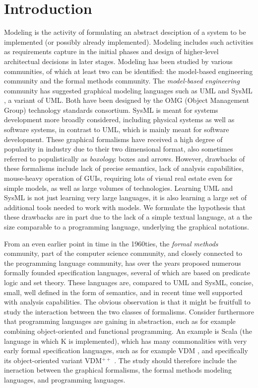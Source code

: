 \section{Introduction}
\label{sec:introduction}

Modeling is the activity of formulating an abstract desciption of a
system to be implemented (or possibly already implemented). Modeling
includes such activities as requirements capture in the initial phases
and design of higher-level architectual decisions in later
stages. Modeling has been studied by various communities, of which at 
least two can be identified: the model-based engineering
community and the formal methods community. The {\em model-based
  engineering} community has suggested graphical modeling languages
such as UML \cite{uml} and SysML \cite{sysml}, a variant of UML. 
Both have been designed by the OMG (Object Management Group)
technology standards consortium. SysML is meant for systems
development more broadly considered, including physical systems as
well as software systems, in contrast to UML, which is mainly meant
for software development. These graphical formalisms have received a
high degree of popularity in industry due to their two dimensional
format, also sometimes referred to populistically as {\em boxology}:
boxes and arrows. However, drawbacks of these formalisms include lack of
precise semantics, lack of analysis capabilities, mouse-heavy
operation of GUIs, requiring lots of visual real estate even for simple models,
as well as large volumes of technologies. Learning UML and SysML
is not just learning very large languages, it is also learning a large
set of additional tools needed to work with
models. We formulate the hypothesis that these drawbacks are in part 
due to the lack of a simple textual language, at a the size comparable to 
a programming language, underlying the graphical notations.

From an even earlier point in time in the 1960ties, the {\em formal
  methods} community, part of the computer science community, and
closely connected to the programming language community, has over the
years proposed numerous formally founded specification languages,
several of which are based on predicate logic and set theory. These
languages are, compared to UML and SysML, concise, small, well defined
in the form of semantics, and in recent time well supported with
analysis capabilities. The obvious observation is that it might be
fruitfull to study the interaction between the two classes of
formalisms. Consider furthermore that programming languages are
gaining in abstraction, such as for example combining object-oriented
and functional programming. An example is Scala (the language in which
K is implemented), which has many commonalities with very early formal
specification languages, such as for example VDM \cite{vdm78}, and
specifically its object-oriented variant VDM$^{++}$
\cite{vdmplusplus05}.  The study should therefore include the
ineraction between the graphical formalisms, the formal methods
modeling languages, and programming languages.

